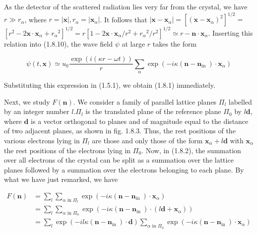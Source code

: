 \documentclass{article}
\begin{document}
As the detector of the scattered radiation lies very far from the crystal, we have $r \gg r_{\alpha}$, where $r=|\boldsymbol{x}|, r_{\alpha}=\left|\boldsymbol{x}_{\alpha}\right|$. It follows that $\left|\boldsymbol{x}-\boldsymbol{x}_{\alpha}\right|=\left[\left(\boldsymbol{x}-\boldsymbol{x}_{\alpha}\right)^{2}\right]^{1 / 2}=$
$\left[r^{2}-2 \boldsymbol{x} \cdot \boldsymbol{x}_{\alpha}+r_{\alpha}{ }^{2}\right]^{1 / 2}=r\left[1-2 \boldsymbol{x} \cdot \boldsymbol{x}_{\alpha} / r^{2}+r_{\alpha}{ }^{2} / r^{2}\right]^{1 / 2} \simeq r-\boldsymbol{n} \cdot \boldsymbol{x}_{\alpha}$. Inserting this relation into (1.8.10), the wave field $\psi$ at large $r$ takes the form
 
\begin{equation*}
\psi(t, \boldsymbol{x}) \simeq u_{0} \frac{\exp (i(\kappa r-\omega t))}{r} \sum_{\alpha} \exp \left(-i \kappa\left(\boldsymbol{n}-\boldsymbol{n}_{\text {in }}\right) \cdot \boldsymbol{x}_{\alpha}\right) \tag{1.8.11}
\end{equation*}
 

Substituting this expression in (1.5.1), we obtain (1.8.1) immediately.

Next, we study $F(\boldsymbol{n})$. We consider a family of parallel lattice planes $\Pi_{l}$ labelled by an integer number $l . \Pi_{l}$ is the translated plane of the reference plane $\Pi_{0}$ by $l \boldsymbol{d}$, where $\boldsymbol{d}$ is a vector orthogonal to planes and of magnitude equal to the distance of two adjacent planes, as shown in fig. 1.8.3. Thus, the rest positions of the various electrons lying in $\Pi_{l}$ are those and only those of the form $\boldsymbol{x}_{\alpha}+l \boldsymbol{d}$ with $\boldsymbol{x}_{\alpha}$ the rest positions of the electrons lying in $\Pi_{0}$. Now, in (1.8.2), the summation over all electrons of the crystal can be split as a summation over the lattice planes followed by a summation over the electrons belonging to each plane. By what we have just remarked, we have
 
\begin{align*}
F(\boldsymbol{n}) & =\sum_{l} \sum_{\alpha \text { in } \Pi_{l}} \exp \left(-i \kappa\left(\boldsymbol{n}-\boldsymbol{n}_{\text {in }}\right) \cdot \boldsymbol{x}_{\alpha}\right)  \tag{1.8.12}\\
& =\sum_{l} \sum_{\alpha \text { in } \Pi_{0}} \exp \left(-i \kappa\left(\boldsymbol{n}-\boldsymbol{n}_{\text {in }}\right) \cdot\left(l \boldsymbol{d}+\boldsymbol{x}_{\alpha}\right)\right) \\
& =\sum_{l} \exp \left(-i l \kappa\left(\boldsymbol{n}-\boldsymbol{n}_{\text {in }}\right) \cdot \boldsymbol{d}\right) \sum_{\alpha \text { in } \Pi_{0}} \exp \left(-i \kappa\left(\boldsymbol{n}-\boldsymbol{n}_{\text {in }}\right) \cdot \boldsymbol{x}_{\alpha}\right)
\end{align*}
 
\end{document}

